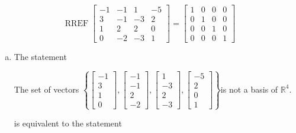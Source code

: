 \begin{exerciseAnswer} 


\[\operatorname{RREF} \left[\begin{array}{cccc}
-1 & -1 & 1 & -5 \\
3 & -1 & -3 & 2 \\
1 & 2 & 2 & 0 \\
0 & -2 & -3 & 1
\end{array}\right] = \left[\begin{array}{cccc}
1 & 0 & 0 & 0 \\
0 & 1 & 0 & 0 \\
0 & 0 & 1 & 0 \\
0 & 0 & 0 & 1
\end{array}\right] \]


\begin{enumerate}[(a)]
\item The statement 
\begin{center}\begin{minipage}{0.8\textwidth}
 The set of vectors \( \left\{ \left[\begin{array}{c}
-1 \\
3 \\
1 \\
0
\end{array}\right] , \left[\begin{array}{c}
-1 \\
-1 \\
2 \\
-2
\end{array}\right] , \left[\begin{array}{c}
1 \\
-3 \\
2 \\
-3
\end{array}\right] , \left[\begin{array}{c}
-5 \\
2 \\
0 \\
1
\end{array}\right] \right\} \)is not a basis of \(\mathbb{R}^4\). 
\end{minipage}\end{center}
     is equivalent to the statement 
\begin{center}\begin{minipage}{0.8\textwidth}
 The set of vectors \( \left\{ \left[\begin{array}{c}
-1 \\
3 \\

\end{array}
\end{minipage}
\end{center}
\end{enumerate}
\end{exerciseAnswer}
